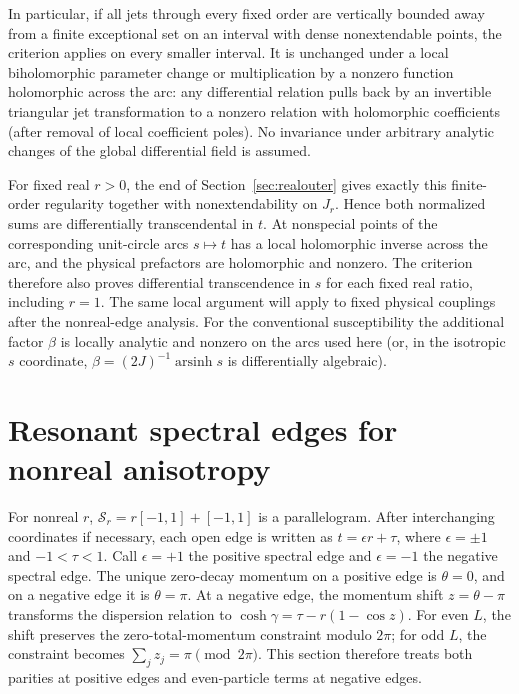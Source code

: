 \documentclass[11pt,a4paper]{article}
\numberwithin{equation}{section}
\theoremstyle{plain}
\theoremstyle{definition}
\begin{document}
In particular, if all jets through every fixed order are vertically bounded away from a finite exceptional set on an interval with dense nonextendable points, the criterion applies on every smaller interval. It is unchanged under a local biholomorphic parameter change or multiplication by a nonzero function holomorphic across the arc: any differential relation pulls back by an invertible triangular jet transformation to a nonzero relation with holomorphic coefficients (after removal of local coefficient poles). No invariance under arbitrary analytic changes of the global differential field is assumed.

For fixed real $r>0$, the end of Section~\ref{sec:realouter} gives exactly this finite-order regularity together with nonextendability on $J_r$. Hence both normalized sums are differentially transcendental in $t$. At nonspecial points of the corresponding unit-circle arcs $s\mapsto t$ has a local holomorphic inverse across the arc, and the physical prefactors are holomorphic and nonzero. The criterion therefore also proves differential transcendence in $s$ for each fixed real ratio, including $r=1$. The same local argument will apply to fixed physical couplings after the nonreal-edge analysis. For the conventional susceptibility the additional factor $\beta$ is locally analytic and nonzero on the arcs used here (or, in the isotropic $s$ coordinate, $\beta=(2J)^{-1}\operatorname{arsinh}s$ is differentially algebraic).

\section{Resonant spectral edges for nonreal anisotropy}\label{sec:edges}

For nonreal \(r\), \(\mathcal S_r=r[-1,1]+[-1,1]\) is a parallelogram. After interchanging coordinates if necessary, each open edge is written as \(t=\epsilon r+\tau\), where \(\epsilon=\pm1\) and \(-1<\tau<1\). Call \(\epsilon=+1\) the positive spectral edge and \(\epsilon=-1\) the negative spectral edge. The unique zero-decay momentum on a positive edge is \(\theta=0\), and on a negative edge it is \(\theta=\pi\). At a negative edge, the momentum shift \(z=\theta-\pi\) transforms the dispersion relation to \(\cosh\gamma=\tau-r(1-\cos z)\). For even \(L\), the shift preserves the zero-total-momentum constraint modulo \(2\pi\); for odd \(L\), the constraint becomes \(\sum_j z_j=\pi\pmod{2\pi}\). This section therefore treats both parities at positive edges and even-particle terms at negative edges.
\end{document}
